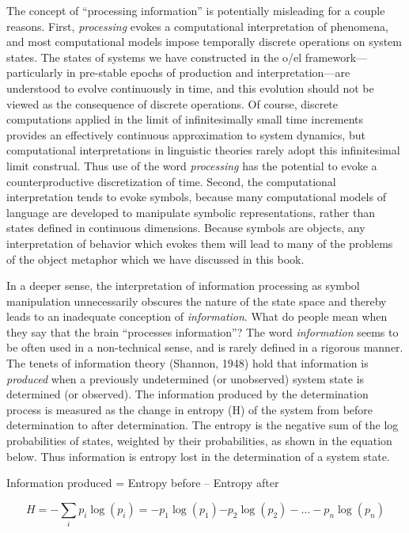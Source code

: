 The concept of “processing information” is potentially misleading for a couple reasons. First, \textit{processing} evokes a computational interpretation of phenomena, and most computational models impose temporally discrete operations on system states. The states of systems we have constructed in the o/el framework—particularly in pre-stable epochs of production and interpretation—are understood to evolve continuously in time, and this evolution should not be viewed as the consequence of discrete operations. Of course, discrete computations applied in the limit of infinitesimally small time increments provides an effectively continuous approximation to system dynamics, but computational interpretations in linguistic theories rarely adopt this infinitesimal limit construal. Thus use of the word \textit{processing} has the potential to evoke a counterproductive discretization of time. Second, the computational interpretation tends to evoke symbols, because many computational models of language are developed to manipulate symbolic representations, rather than states defined in continuous dimensions. Because symbols are objects, any interpretation of behavior which evokes them will lead to many of the problems of the object metaphor which we have discussed in this book. 

In a deeper sense, the interpretation of information processing as symbol manipulation unnecessarily obscures the nature of the state space and thereby leads to an inadequate conception of \textit{information}. What do people mean when they say that the brain “processes information”? The word \textit{information} seems to be often used in a non-technical sense, and is rarely defined in a rigorous manner. The tenets of information theory (Shannon, 1948) hold that information is \textit{produced} when a previously undetermined (or unobserved) system state is determined (or observed). The information produced by the determination process is measured as the change in entropy (H) of the system from before determination to after determination. The entropy is the negative sum of the log probabilities of states, weighted by their probabilities, as shown in the equation below. Thus information is entropy lost in the determination of a system state.

  Information produced = Entropy before – Entropy after

\begin{equation*}
H=-\sum _{i}{{p}_{i}\log \left({p}_{i}\right)={-p}_{1}\log \left({p}_{1}\right){-p}_{2}\log \left({p}_{2}\right)-{\dots}-{p}_{n}\log \text{⁡}\left({p}_{n}\right)}
\end{equation*}

